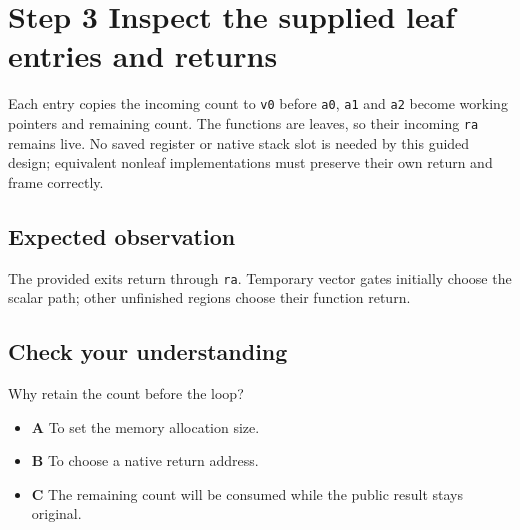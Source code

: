 \section{Step 3 Inspect the supplied leaf entries and returns}\label{rgb-s03}

Each entry copies the incoming count to \texttt{v0} before \texttt{a0}, \texttt{a1} and \texttt{a2} become working pointers and remaining count. The functions are leaves, so their incoming \texttt{ra} remains live. No saved register or native stack slot is needed by this guided design; equivalent nonleaf implementations must preserve their own return and frame correctly.

\subsection{Expected observation}
The provided exits return through \texttt{ra}. Temporary vector gates initially choose the scalar path; other unfinished regions choose their function return.

\subsection{Check your understanding}
Why retain the count before the loop?

\begin{itemize}
  \item \textbf{A} To set the memory allocation size.
  \item \textbf{B} To choose a native return address.
  \item \textbf{C} The remaining count will be consumed while the public result stays original.
\end{itemize}
